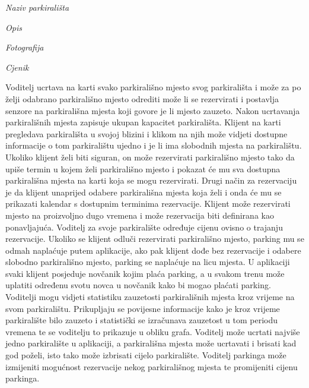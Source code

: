                 \begin{packed_item}
			\item \textit{Naziv parkirališta }
			\item \textit{Opis }
			\item \textit{Fotografija}
                        \item \textit{Cjenik}
		\end{packed_item}

Voditelj ucrtava na karti svako parkirališno mjesto svog parkirališta i može za po želji odabrano parkirališno mjesto odrediti može li se rezervirati i postavlja senzore na parkirališna mjesta koji govore je li mjesto zauzeto. Nakon ucrtavanja parkirališnih mjesta zapisuje ukupan kapacitet parkirališta.
Klijent na karti pregledava parkirališta u svojoj blizini i klikom na njih može vidjeti dostupne informacije o tom parkiralištu ujedno i je li ima slobodnih mjesta na parkiralištu. Ukoliko klijent želi biti siguran, on može rezervirati parkirališno mjesto tako da upiše termin u kojem želi parkirališno mjesto i pokazat će mu sva dostupna parkirališna mjesta na karti koja se mogu rezervirati. Drugi način za rezervaciju je da klijent unaprijed odabere parkirališna mjesta koja želi i onda će mu se prikazati kalendar s dostupnim terminima rezervacije. Klijent može rezervirati mjesto na proizvoljno dugo vremena i može rezervacija biti definirana kao ponavljajuća. Voditelj za svoje parkiralište određuje cijenu ovisno o trajanju rezervacije. Ukoliko se klijent odluči rezervirati parkirališno mjesto, parking mu se odmah naplaćuje putem aplikacije, ako pak klijent dođe bez rezervacije i odabere slobodno parkirališno mjesto, parking se naplaćuje na licu mjesta. U aplikaciji svaki klijent posjeduje novčanik kojim plaća parking, a u svakom trenu može uplatiti određenu svotu novca u novčanik kako bi mogao plaćati parking.
Voditelji mogu vidjeti statistiku zauzetosti parkirališnih mjesta kroz vrijeme na svom parkiralištu. Prikupljaju se povijesne informacije kako je kroz vrijeme parkiralište bilo zauzeto i statistički se izračunava zauzetost u tom periodu vremena te se voditelju to prikazuje u obliku grafa. Voditelj može ucrtati najviše jedno parkiralište u aplikaciji, a parkirališna mjesta može ucrtavati i brisati kad god poželi, isto tako može izbrisati cijelo parkiralište. Voditelj parkinga može izmijeniti mogućnost rezervacije nekog parkirališnog mjesta te promijeniti cijenu parkinga. 
